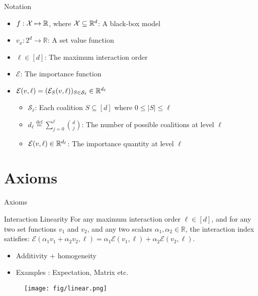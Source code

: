 \documentclass[10pt]{beamer}
\newcommand{\f}{v}
\newcommand{\x}{x}
\newcommand{\ex}{\Expl}
\def\Expl{\mathcal{E}}
\newcommand*{\defeq}{\stackrel{\text{def}}{=}}
\begin{document}
\begin{frame}{Notation}
\begin{itemize}
    \itemsep1.5em %
    \item $f : \mathcal{X} \mapsto \mathbb{R}$, where $\mathcal{X} \subseteq \mathbb{R}^d$: A black-box model
    \item $\f_{\x} : 2^d \rightarrow \mathbb{R}$: A set value function
    \item $\ell \in [d]$: The maximum interaction order
    \item $\ex$: The importance function
    \item $\ex(\f, \ell) = (\ex_{S}(\f, \ell))_{S \in \mathcal{S}_\ell} \in \R^{d_\ell}$
    \begin{itemize}
        \vspace{0.3cm}
        \itemsep1.2em
        \item $\mathcal{S}_\ell$: Each coalition $S \subseteq [d]$ where $0 \leq |S| \leq \ell$
        \item $d_{\ell} \defeq \sum_{j=0}^{\ell} \binom{d}{j}$: The number of possible coalitions at level $\ell$
        \item $\ex(\f, \ell) \in \R^{d_\ell}$: The importance quantity at level $\ell$
    \end{itemize}
\end{itemize}
\end{frame}
\section[Axioms]{Axioms}

\begin{frame}{Axioms}
    \begin{myaxiombox}{Interaction Linearity}
    For any maximum interaction order $\ell \in [d]$, and for any two set functions $\f_1$ and $\f_2$, and any two scalars $\alpha_1, \alpha_2 \in \mathbb{R}$, the interaction index satisfies: $\ex(\alpha_1 \f_1+ \alpha_2 \f_2,\ell) = \alpha_1 \ex(\f_1,\ell) + \alpha_2 \ex(\f_2,\ell)$.
    \end{myaxiombox}
    \vspace{1.5em}
    \begin{itemize}[label=\scalebox{0.5}{$\blacksquare$}]
        \item Additivity + homogeneity
        \item Examples : Expectation, Matrix etc.
    \end{itemize}
\end{frame}
\begin{frame}
    \begin{figure}[h]
    \centering
    \texttt{[image: fig/linear.png]}
    \end{figure}
\end{frame}
\end{document}
